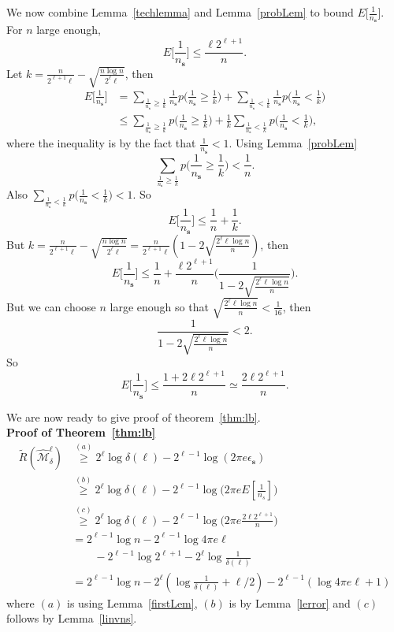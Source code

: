 \documentclass[conference,a4paper]{article}
\newcommand{\s}{\textbf{s}}
\newcommand{\M}{\mathcal{M}}
\begin{document}
We now combine Lemma~\ref{techlemma} and Lemma~\ref{probLem} to bound $E\big[\frac1{n_\s}\big]$.
\bLemma For $n$ large enough,
\label{linvns}
\[
E\bigg[\frac1{n_\s}\bigg]\leq  \frac{\ell 2^{\ell+1}}{n}.
\]
\Proof
Let $k=\frac{n}{2^{\ell+1}\ell}-\sqrt{\frac{n\log n}{2^{\ell}\ell}}$, then
\begin{align*}
E\bigg[\frac1{n_\s}\bigg]
&=\sum_{\frac1{n_\s}\geq \frac1{k}}\frac1{n_\s}p\bigg(\frac1{n_\s}\geq \frac1{k}\bigg) 
	+\sum_{\frac1{n_\s}< \frac1{k}}\frac1{n_\s}p\bigg(\frac1{n_\s}< \frac1{k}\bigg)\\
&\leq \sum_{\frac1{n_\s}\geq \frac1{k}}p\bigg(\frac1{n_\s}\geq \frac1{k}\bigg)
	+\frac1{k}\sum_{\frac1{n_\s}< \frac1{k}}p\bigg(\frac1{n_\s}< \frac1{k}\bigg),
\end{align*}
where the inequality is by the fact that $\frac1{n_\s}<1$. Using Lemma~\ref{probLem}
\[
\sum_{\frac1{n_\s}\geq \frac1{k}}p\bigg(\frac1{n_\s}\geq \frac1{k}\bigg)<\frac1{n}.
\]
Also $\sum_{\frac1{n_\s}< \frac1{k}}p\bigg(\frac1{n_\s}< \frac1{k}\bigg)<1$. So	
\[
E\bigg[\frac1{n_\s}\bigg]
\leq
\frac1{n}+\frac1{k}.
\]
But $k=\frac{n}{2^{\ell+1}\ell}-\sqrt{\frac{n\log n}{2^{\ell}\ell}}=
\frac{n}{2^{\ell+1}\ell}(1-2\sqrt{\frac{2^{\ell}\ell\log n}{n}})
$, then 
\[
E\bigg[\frac1{n_\s}\bigg]
\leq 
\frac1{n}
+
\frac{\ell 2^{\ell+1}}{n}\bigg(\frac1{1-2\sqrt{\frac{2^{\ell}\ell\log n}{n}}}\bigg).
\]
But we can choose $n$ large enough so that $\sqrt{\frac{2^{\ell}\ell\log n}{n}}<\frac1{16}$, then
\[
\frac1{1-2\sqrt{\frac{2^{\ell}\ell\log n}{n}}}<2.
\]
So
\[
E\bigg[\frac1{n_\s}\bigg]\leq \frac{1+2\ell 2^{\ell+1}}{n}\simeq \frac{2\ell 2^{\ell+1}}{n}.
\]
\eLemma

We are now ready to give proof of theorem~\ref{thm:lb}.\\
\textbf{Proof of Theorem~\ref{thm:lb}}
\begin{align*}
\tilde{R}(\hat{\M}^{\ell}_{\delta})
&\overset{(a)}{\geq}
2^{\ell}\log \delta(\ell) - 2^{\ell-1}\log \left(2\pi e\epsilon_\s\right)\\
&\overset{(b)}{\geq} 
2^{\ell}\log \delta(\ell) - 2^{\ell-1}\log \big(2\pi e E[\frac1{n_s}] \big)\\
&\overset{(c)}{\geq}
2^{\ell}\log \delta(\ell) -2^{\ell-1}\log \big(2\pi e \frac{2\ell 2^{\ell+1}}{n} \big)\\
&= 2^{\ell-1}\log n -2^{\ell-1}\log 4\pi e\ell \\
&\quad\quad- 2^{\ell-1}\log 2^{\ell+1}-2^\ell\log \frac1{\delta(\ell)}\\
&=2^{\ell-1}\log n-2^\ell(\log \frac1{\delta(\ell)}+ \ell/2)-2^{\ell-1}(\log 4\pi e\ell+1)
\end{align*}
where $(a)$ is using Lemma~\ref{firstLem}, $(b)$ is by Lemma~\ref{lerror} and $(c)$ follows by Lemma~\ref{linvns}.
\end{document}
